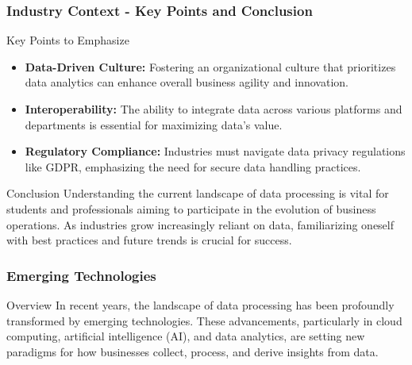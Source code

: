 \documentclass{beamer}
\begin{document}
\begin{frame}[fragile]
    \frametitle{Industry Context - Key Points and Conclusion}
    \begin{block}{Key Points to Emphasize}
        \begin{itemize}
            \item \textbf{Data-Driven Culture:} Fostering an organizational culture that prioritizes data analytics can enhance overall business agility and innovation.
            \item \textbf{Interoperability:} The ability to integrate data across various platforms and departments is essential for maximizing data's value.
            \item \textbf{Regulatory Compliance:} Industries must navigate data privacy regulations like GDPR, emphasizing the need for secure data handling practices.
        \end{itemize}
    \end{block}
    
    \begin{block}{Conclusion}
        Understanding the current landscape of data processing is vital for students and professionals aiming to participate in the evolution of business operations. As industries grow increasingly reliant on data, familiarizing oneself with best practices and future trends is crucial for success.
    \end{block}
\end{frame}

\begin{frame}[fragile]
    \frametitle{Emerging Technologies}
    \begin{block}{Overview}
        In recent years, the landscape of data processing has been profoundly transformed by emerging technologies. These advancements, particularly in cloud computing, artificial intelligence (AI), and data analytics, are setting new paradigms for how businesses collect, process, and derive insights from data.
    \end{block}
\end{frame}
\end{document}
